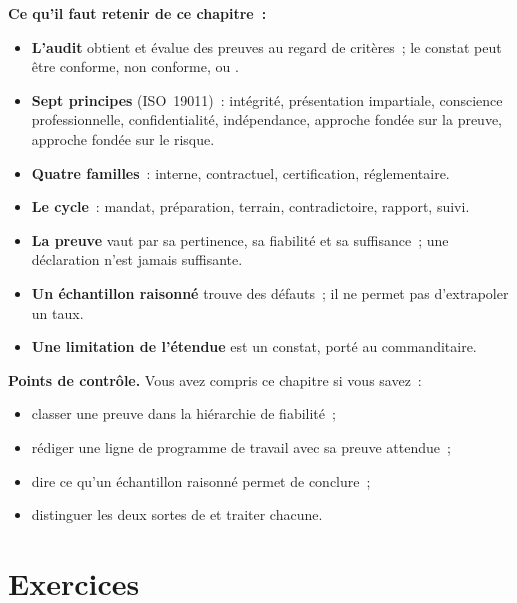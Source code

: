 \begin{boxresume}
\textbf{Ce qu'il faut retenir de ce chapitre~:}
\begin{itemize}
    \item \textbf{L'audit} obtient et évalue des preuves au regard de
          critères~; le constat peut être conforme, non conforme, ou
          \NEK{}.
    \item \textbf{Sept principes} (ISO~19011)~: intégrité, présentation
          impartiale, conscience professionnelle, confidentialité,
          indépendance, approche fondée sur la preuve, approche fondée sur
          le risque.
    \item \textbf{Quatre familles}~: interne, contractuel, certification,
          réglementaire.
    \item \textbf{Le cycle}~: mandat, préparation, terrain, contradictoire,
          rapport, suivi.
    \item \textbf{La preuve} vaut par sa pertinence, sa fiabilité et sa
          suffisance~; une déclaration n'est jamais suffisante.
    \item \textbf{Un échantillon raisonné} trouve des défauts~; il ne
          permet pas d'extrapoler un taux.
    \item \textbf{Une limitation de l'étendue} est un constat, porté au
          commanditaire.
\end{itemize}
\end{boxresume}

\begin{boxinfo}
\textbf{Points de contrôle.} Vous avez compris ce chapitre si vous savez~:
\begin{itemize}
    \item classer une preuve dans la hiérarchie de fiabilité~;
    \item rédiger une ligne de programme de travail avec sa preuve
          attendue~;
    \item dire ce qu'un échantillon raisonné permet de conclure~;
    \item distinguer les deux sortes de \NEK{} et traiter chacune.
\end{itemize}
\end{boxinfo}

\section*{Exercices}

